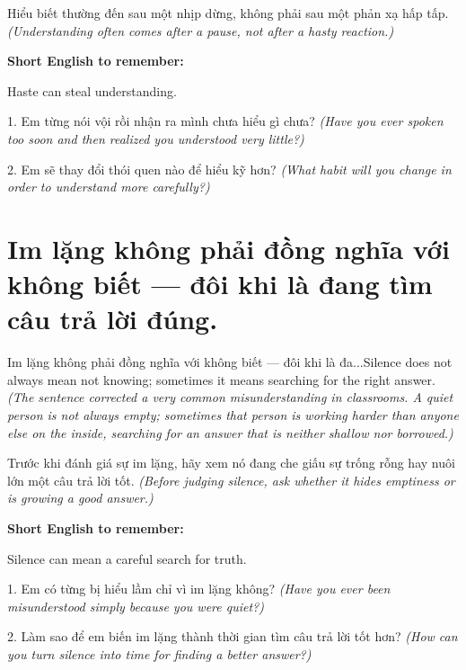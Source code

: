 \begin{baihoc}
Hiểu biết thường đến sau một nhịp dừng, không phải sau một phản xạ hấp tấp.
\textit{(Understanding often comes after a pause, not after a hasty reaction.)}
\end{baihoc}

\begin{ghinhoanh}
\textbf{Short English to remember:}

Haste can steal understanding.

\end{ghinhoanh}

\begin{tuhocnhanh}
1. Em từng nói vội rồi nhận ra mình chưa hiểu gì chưa? \textit{(Have you ever spoken too soon and then realized you understood very little?)}

2. Em sẽ thay đổi thói quen nào để hiểu kỹ hơn? \textit{(What habit will you change in order to understand more carefully?)}
\end{tuhocnhanh}
\ngancach


\section{Im lặng không phải đồng nghĩa với không biết — đôi khi là đang tìm câu trả lời đúng.}
\begin{truyen}{Im lặng không phải đồng nghĩa với không biết — đôi khi là đa...}{Silence does not always mean not knowing; sometimes it means searching for the right answer.}
\textit{(The sentence corrected a very common misunderstanding in classrooms. A quiet person is not always empty; sometimes that person is working harder than anyone else on the inside, searching for an answer that is neither shallow nor borrowed.)}
\end{truyen}

\begin{baihoc}
Trước khi đánh giá sự im lặng, hãy xem nó đang che giấu sự trống rỗng hay nuôi lớn một câu trả lời tốt.
\textit{(Before judging silence, ask whether it hides emptiness or is growing a good answer.)}
\end{baihoc}

\begin{ghinhoanh}
\textbf{Short English to remember:}

Silence can mean a careful search for truth.

\end{ghinhoanh}

\begin{tuhocnhanh}
1. Em có từng bị hiểu lầm chỉ vì im lặng không? \textit{(Have you ever been misunderstood simply because you were quiet?)}

2. Làm sao để em biến im lặng thành thời gian tìm câu trả lời tốt hơn? \textit{(How can you turn silence into time for finding a better answer?)}
\end{tuhocnhanh}
\ngancach
